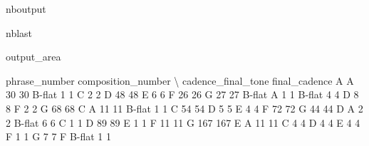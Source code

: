 \documentclass[letterpaper,10pt,english]{sphinxmanual}
\begin{document}
\begin{sphinxuseclass}{nboutput}
\begin{sphinxuseclass}{nblast}
{\begin{sphinxuseclass}{output_area}
\begin{sphinxuseclass}{}
\begin{sphinxVerbatim}[commandchars=\\\{\}]
\llap{\color{nbsphinxout}[26]:\,\hspace{\fboxrule}\hspace{\fboxsep}}                                  phrase\_number  composition\_number  \textbackslash{}
cadence\_final\_tone final\_cadence
A                  A                         30                  30
                   B-flat                     1                   1
                   C                          2                   2
                   D                         48                  48
                   E                          6                   6
                   F                         26                  26
                   G                         27                  27
B-flat             A                          1                   1
                   B-flat                     4                   4
                   D                          8                   8
                   F                          2                   2
                   G                         68                  68
C                  A                         11                  11
                   B-flat                     1                   1
                   C                         54                  54
                   D                          5                   5
                   E                          4                   4
                   F                         72                  72
                   G                         44                  44
D                  A                          2                   2
                   B-flat                     6                   6
                   C                          1                   1
                   D                         89                  89
                   E                          1                   1
                   F                         11                  11
                   G                        167                 167
E                  A                         11                  11
                   C                          4                   4
                   D                          4                   4
                   E                          4                   4
                   F                          1                   1
                   G                          7                   7
F                  B-flat                     1                   1

\end{sphinxVerbatim}
\end{sphinxuseclass}
\end{sphinxuseclass}}
\end{sphinxuseclass}
\end{sphinxuseclass}
\end{document}
